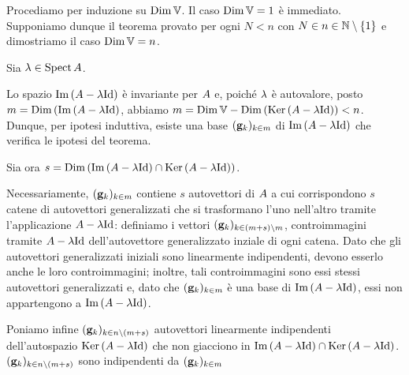 \Proof Procediamo per induzione su $\operatorname{Dim}{\mathbb{V}}$. Il caso
$\operatorname{Dim}{\mathbb{V}} = 1$ \`e immediato. Supponiamo dunque il teorema
provato per ogni $N < n$ con $N \in n \in \mathbb{N} \setminus \lbrace 1 \rbrace$
e dimostriamo il caso $\operatorname{Dim}{\mathbb{V}} = n$.
\par Sia $\lambda \in \operatorname{Spect}{A}$.
\par Lo spazio
$\Image{(\LinearTransformation - \Eigenvalue\Identity)}$
\`e invariante per $A$ e, poich\'e $\lambda$ \`e
autovalore,
posto
$m = \LinearDimension{(\Image{(\LinearTransformation - \Eigenvalue\Identity)}}$,
abbiamo
$m =
\LinearDimension{\LinearSpace} -
\LinearDimension{(\Kernel{(\LinearTransformation - \Eigenvalue\Identity)})} < n$.
Dunque, per ipotesi induttiva, esiste una base
$(\GeneralizedEigenvector_k)_{k \in m}$
di
$\Image{(\LinearTransformation - \Eigenvalue\Identity)}$
che verifica le ipotesi del teorema.
\par Sia ora
$s = \LinearDimension{(\Image{(\LinearTransformation - \Eigenvalue\Identity)}
\cap \Kernel{(\LinearTransformation - \Eigenvalue\Identity)})}$.
\par Necessariamente,
$(\GeneralizedEigenvector_k)_{k \in m}$
contiene $s$ autovettori di $A$ a cui corrispondono
$s$ catene di autovettori generalizzati che si trasformano l'uno nell'altro
tramite l'applicazione $\LinearTransformation - \Eigenvalue\Identity$:
definiamo i vettori
$(\GeneralizedEigenvector_k)_{k \in (m + s) \SetMin m}$,
controimmagini tramite
$\LinearTransformation - \Eigenvalue\Identity$ dell'autovettore generalizzato
inziale di ogni catena. Dato che gli autovettori generalizzati
iniziali sono linearmente indipendenti, devono esserlo anche le loro
controimmagini; inoltre, tali controimmagini sono essi stessi autovettori
generalizzati e, dato che
$(\GeneralizedEigenvector_k)_{k \in m}$
\`e una base di
$\Image{(\LinearTransformation - \Eigenvalue\Identity)}$,
essi non appartengono a 
$\Image{(\LinearTransformation - \Eigenvalue\Identity)}$.
\par Poniamo infine
$(\GeneralizedEigenvector_k)_{k \in n \SetMin (m + s)}$
autovettori linearmente indipendenti dell'autospazio
$\Kernel{(\LinearTransformation - \Eigenvalue\Identity)}$
che non giacciono in
$\Image{(\LinearTransformation - \Eigenvalue\Identity)}
\cap \Kernel{(\LinearTransformation - \Eigenvalue\Identity)}$.
$(\GeneralizedEigenvector_k)_{k \in n \SetMin (m + s)}$
sono indipendenti da
$(\GeneralizedEigenvector_k)_{k \in m}$
